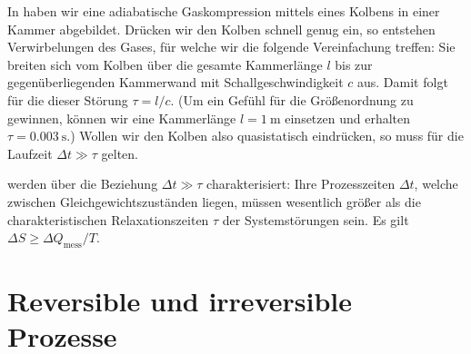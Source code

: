 In  haben wir eine adiabatische Gaskompression mittels eines Kolbens in einer Kammer abgebildet. Drücken wir den Kolben schnell genug ein, so entstehen Verwirbelungen des Gases, für welche wir die folgende Vereinfachung treffen: Sie breiten sich vom Kolben über die gesamte Kammerlänge $l$ bis zur gegenüberliegenden Kammerwand mit Schallgeschwindigkeit $c$ aus. Damit folgt für die  dieser Störung $\tau =l/c$. (Um ein Gefühl für die Größenordnung zu gewinnen, können wir eine Kammerlänge $l=\qty{1}{\m}$ einsetzen und erhalten $\tau=\qty{0.003}{\s}$.) Wollen wir den Kolben also quasistatisch eindrücken, so muss für die Laufzeit $\Delta t \gg\tau$ gelten.
\begin{formal}
     werden über die Beziehung $\Delta t \gg\tau$ charakterisiert: Ihre Prozesszeiten $\Delta t$, welche zwischen Gleichgewichtszuständen liegen, müssen wesentlich größer als die charakteristischen Relaxationszeiten $\tau$ der Systemstörungen sein.
    Es gilt $\Delta S\geq\Delta Q_{\mathrm{mess}}/T$.
\end{formal}  

\section{Reversible und irreversible Prozesse}

